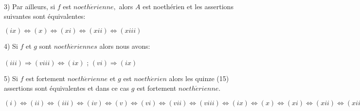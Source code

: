 \begin{montheoreme}
	3) Par ailleurs, si $f$ est $noeth\acute{e}rienne,$ alors $A$ est noethérien et les assertions suivantes sont équivalentes:
	
	$(ix)\Longleftrightarrow (x)\Longleftrightarrow (xi)\Longleftrightarrow
	(xii)\Longleftrightarrow (xiii)$
	
	4) Si $f$ et $g$ sont $noeth\acute{e}riennes$ alors nous avons:
	
	$(iii)\Longrightarrow (viii)\Longleftrightarrow (ix)$ ; $(vi)\Longrightarrow (ix)$
	
	5) Si $f$ est fortement $noeth\acute{e}rienne$ et $g$ est $noeth\acute{e}rien
	$ alors les quinze (15) assertions sont équivalentes et dans ce cas $g$
	est fortement $noeth\acute{e}rienne.$
	
	$(i)\Longleftrightarrow (ii)\Longleftrightarrow (iii)\Longleftrightarrow
	(iv)\Longleftrightarrow (v)\Longleftrightarrow (vi)\Longleftrightarrow
	(vii)\Longleftrightarrow (viii)\Longleftrightarrow (ix)\Longleftrightarrow
	(x)\Longleftrightarrow (xi)\Longleftrightarrow (xii)\Longleftrightarrow
	(xiii)\Longleftrightarrow (xiv)\Longleftrightarrow (xv).$
\end{montheoreme}
